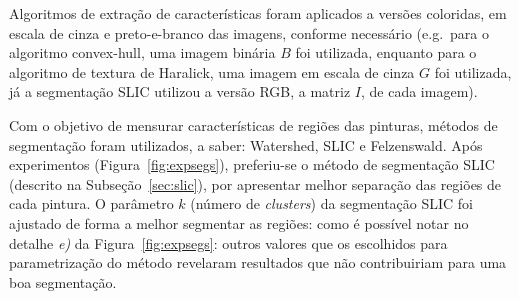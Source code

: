 Algoritmos de extração de características foram aplicados a versões coloridas,
em escala de cinza e preto-e-branco das imagens, conforme necessário (e.g.\ para
o algoritmo convex-hull, uma imagem binária $B$ foi utilizada, enquanto para o
algoritmo de textura de Haralick, uma imagem em escala de cinza $G$ foi
utilizada, já a segmentação SLIC utilizou a versão RGB, a matriz $I$, de cada
imagem).

Com o objetivo de mensurar características de regiões das pinturas, métodos de
segmentação foram utilizados, a saber: Watershed, SLIC e Felzenswald. Após
experimentos (Figura~\ref{fig:expsegs}), preferiu-se o método de segmentação
SLIC (descrito na Subseção~\ref{sec:slic}), por apresentar melhor separação das
regiões de cada pintura. O parâmetro $k$ (número de \textit{clusters}) da
segmentação SLIC foi ajustado de forma a melhor segmentar as regiões: como é
possível notar no detalhe \textit{e)} da Figura~\ref{fig:expsegs}: outros
valores que os escolhidos para parametrização do método revelaram resultados que
não contribuiriam para uma boa segmentação.

